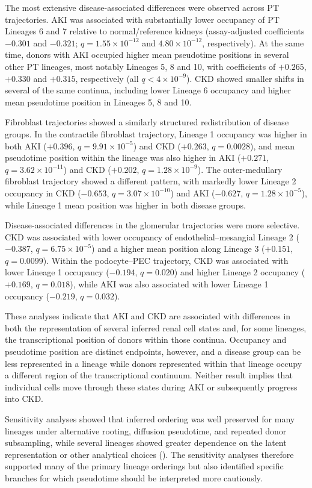 \documentclass[10pt,letterpaper]{article}
\begin{document}
The most extensive disease-associated differences were observed across PT trajectories. AKI was associated with substantially lower occupancy of PT Lineages 6 and 7 relative to normal/reference kidneys (assay-adjusted coefficients $-0.301$ and $-0.321$; $q=1.55\times10^{-12}$ and $4.80\times10^{-12}$, respectively). At the same time, donors with AKI occupied higher mean pseudotime positions in several other PT lineages, most notably Lineages 5, 8 and 10, with coefficients of $+0.265$, $+0.330$ and $+0.315$, respectively (all $q<4\times10^{-9}$). CKD showed smaller shifts in several of the same continua, including lower Lineage 6 occupancy and higher mean pseudotime position in Lineages 5, 8 and 10.

Fibroblast trajectories showed a similarly structured redistribution of disease groups. In the contractile fibroblast trajectory, Lineage 1 occupancy was higher in both AKI ($+0.396$, $q=9.91\times10^{-5}$) and CKD ($+0.263$, $q=0.0028$), and mean pseudotime position within the lineage was also higher in AKI ($+0.271$, $q=3.62\times10^{-11}$) and CKD ($+0.202$, $q=1.28\times10^{-9}$). The outer-medullary fibroblast trajectory showed a different pattern, with markedly lower Lineage 2 occupancy in CKD ($-0.653$, $q=3.07\times10^{-10}$) and AKI ($-0.627$, $q=1.28\times10^{-5}$), while Lineage 1 mean position was higher in both disease groups.

Disease-associated differences in the glomerular trajectories were more selective. CKD was associated with lower occupancy of endothelial--mesangial Lineage 2 ($-0.387$, $q=6.75\times10^{-5}$) and a higher mean position along Lineage 3 ($+0.151$, $q=0.0099$). Within the podocyte--PEC trajectory, CKD was associated with lower Lineage 1 occupancy ($-0.194$, $q=0.020$) and higher Lineage 2 occupancy ($+0.169$, $q=0.018$), while AKI was also associated with lower Lineage 1 occupancy ($-0.219$, $q=0.032$).

These analyses indicate that AKI and CKD are associated with differences in both the representation of several inferred renal cell states and, for some lineages, the transcriptional position of donors within those continua. Occupancy and pseudotime position are distinct endpoints, however, and a disease group can be less represented in a lineage while donors represented within that lineage occupy a different region of the transcriptional continuum. Neither result implies that individual cells move through these states during AKI or subsequently progress into CKD.

Sensitivity analyses showed that inferred ordering was well preserved for many lineages under alternative rooting, diffusion pseudotime, and repeated donor subsampling, while several lineages showed greater dependence on the latent representation or other analytical choices (). The sensitivity analyses therefore supported many of the primary lineage orderings but also identified specific branches for which pseudotime should be interpreted more cautiously.
\end{document}
